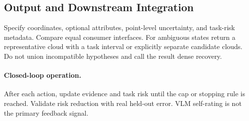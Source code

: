 \subsection{Output and Downstream Integration}
Specify coordinates, optional attributes, point-level uncertainty, and task-risk metadata. Compare equal consumer interfaces. For ambiguous states return a representative cloud with a task interval or explicitly separate candidate clouds. Do not union incompatible hypotheses and call the result dense recovery.

\paragraph{Closed-loop operation.}
After each action, update evidence and task risk until the cap or stopping rule is reached. Validate risk reduction with real held-out error. VLM self-rating is not the primary feedback signal.
